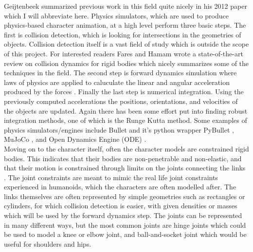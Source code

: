 \documentclass[12pt, a4paper]{article}
\begin{document}
Geijtenbeek summarized previous work in this field quite nicely in his 2012 paper \cite{Geijtenbeek} which I will abbreviate here. Physics simulators, which are used to produce physics-based character animation, at a high level perform three basic steps. The first is collision detection, which is looking for intersections in the geometries of objects. Collision detection itself is a vast field of study which is outside the scope of this project. For interested readers Fares and Hamam \cite{fares2005collision} 
wrote a state-of-the-art review on collision dynamics for rigid bodies which nicely summarizes some of the techniques in the field. The second step is forward dynamics simulation where laws of physics are applied to  caluculate the linear and angular acceleration produced by the forces \cite{walking_survey}. Finally the last step is numerical integration. Using the previously computed accelerations the positions, orientations, and velocities of the objects are updated. Again there has been some effort put into finding robust integration methods, one of which is the Runge Kutta method. Some examples of physics simulators/engines include Bullet and it's python wrapper PyBullet \cite{pybullet}, MuJoCo \cite{mujoco}, and Open Dynamics Engine (ODE) \cite{ode}.\\ 

Moving on to the character itself, often the character models are constrained rigid bodies. This indicates that their bodies are non-penetrable and non-elastic, and that their motion is constrained through limits on the joints connecting the links \cite{Geijtenbeek}. 
The joint constraints are meant to mimic the real life joint constraints experienced in humanoids, which the characters are often modelled after. The links themselves are often represented by simple geometries such as rectangles or cylinders, for which collision detection is easier, with given densities or masses which will be used by the forward dynamics step. The joints can be represented in many different ways, but the most common joints are hinge joints which could be used to model a knee or elbow joint, and ball-and-socket joint which would be useful for shoulders and hips.\\
\end{document}
